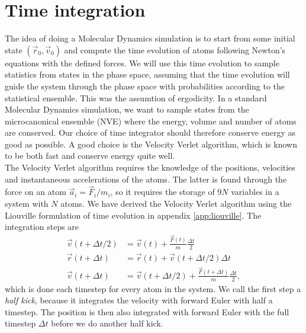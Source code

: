 \section{Time integration}
\label{sec:md_time_integration}
The idea of doing a Molecular Dynamics simulation is to start from some initial state $(\vec r_0, \vec v_0)$ and compute the time evolution of atoms following Newton's equations with the defined forces. We will use this time evolution to sample statistics from states in the phase space, assuming that the time evolution will guide the system through the phase space with probabilities according to the statistical ensemble. This was the assumtion of ergodicity. In a standard Molecular Dynamics simulation, we want to sample states from the microcanonical ensemble (NVE) where the energy, volume and number of atoms are conserved. Our choice of time integrator should therefore conserve energy as good as possible. A good choice is the Velocity Verlet algorithm, which is known to be both fast and conserve energy quite well\cite{frenkel2001understanding}.\\
The Velocity Verlet algorithm requires the knowledge of the positions, velocities and instantaneous accelerations of the atoms. The latter is found through the force on an atom $\vec a_i = \vec F_i/m_i$, so it requires the storage of $9N$ variables in a system with $N$ atoms. We have derived the Velocity Verlet algorithm using the Liouville formulation of time evolution in appendix \ref{app:liouville}. The integration steps are
\begin{align}
	\vec v(t + \Delta t/2) &= \vec v(t) + \frac{\vec F(t)}{m}\frac{\Delta t}{2}\\
	\vec r(t + \Delta t) &= \vec r(t) + \vec v(t + \Delta t/2)\Delta t\\
	\vec v(t + \Delta t) &= \vec v(t + \Delta t/2) + \frac{\vec F(t + \Delta t)}{m}\frac{\Delta t}{2},
\end{align}
which is done each timestep for every atom in the system. We call the first step a \textit{half kick}, because it integrates the velocity with forward Euler with half a timestep. The position is then also integrated with forward Euler with the full timestep $\Delta t$ before we do another half kick.